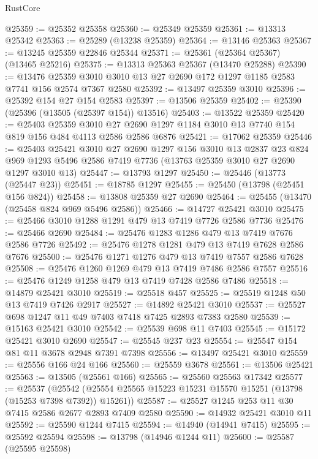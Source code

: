 \begin{lexlean}{RustCore}
\begin{coremodule}
@25359 := @25352 @25358
@25360 := @25349 @25359
@25361 := @13313 @25342
@25363 := @25289 (@13238 @25359)
@25364 := @13146 @25363
@25367 := @13245 @25359 @22846 @25344
@25371 := @25361 (@25364 @25367) (@13465 @25216)
@25375 := @13313 @25363 @25367 (@13470 @25288)
@25390 := @13476
    @25359
    @3010
    @3010
    @13
    @27
    @2690
    @172
    @1297
    @1185
    @2583
    @7741
    @156
    @2574
    @7367
    @2580
@25392 := @13497 @25359 @3010
@25396 := @25392 @154 @27 @154 @2583
@25397 := @13506 @25359
@25402 := @25390 (@25396 (@13505 (@25397 @154)) @13516)
@25403 := @13522 @25359
@25420 := @25403
    @25359
    @3010
    @27
    @2690
    @1297
    @1184
    @3010
    @13
    @7740
    @154
    @819
    @156
    @484
    @4113
    @2586
    @2586
    @6876
@25421 := @17062 @25359
@25446 := @25403
    @25421
    @3010
    @27
    @2690
    @1297
    @156
    @3010
    @13
    @2837
    @23
    @824
    @969
    @1293
    @5496
    @2586
    @7419
    @7736
    (@13763 @25359 @3010 @27 @2690 @1297 @3010 @13)
@25447 := @13793 @1297
@25450 := @25446 (@13773 (@25447 @23))
@25451 := @18785 @1297
@25455 := @25450 (@13798 (@25451 @156 @824))
@25458 := @13808 @25359 @27 @2690
@25464 := @25455 (@13470 (@25458 @824 @969 @5496 @2586))
@25466 := @14727 @25421 @3010
@25475 := @25466 @3010 @1288 @1291 @479 @13 @7419 @7726 @2586 @7736
@25476 := @25466 @2690
@25484 := @25476 @1283 @1286 @479 @13 @7419 @7676 @2586 @7726
@25492 := @25476 @1278 @1281 @479 @13 @7419 @7628 @2586 @7676
@25500 := @25476 @1271 @1276 @479 @13 @7419 @7557 @2586 @7628
@25508 := @25476 @1260 @1269 @479 @13 @7419 @7486 @2586 @7557
@25516 := @25476 @1249 @1258 @479 @13 @7419 @7428 @2586 @7486
@25518 := @14879 @25421 @3010
@25519 := @25518 @457
@25525 := @25519 @1248 @50 @13 @7419 @7426 @2917
@25527 := @14892 @25421 @3010
@25537 := @25527 @698 @1247 @11 @49 @7403 @7418 @7425 @2893 @7383 @2580
@25539 := @15163 @25421 @3010
@25542 := @25539 @698 @11 @7403
@25545 := @15172 @25421 @3010 @2690
@25547 := @25545 @237 @23
@25554 := @25547 @154 @81 @11 @3678 @2948 @7391 @7398
@25556 := @13497 @25421 @3010
@25559 := @25556 @166 @24 @166
@25560 := @25559 @3678
@25561 := @13506 @25421
@25563 := @13505 (@25561 @166)
@25565 := @25560 @25563 @17342
@25577 := @25537
    (@25542 (@25554 @25565 @15223 @15231 @15570 @15251 (@13798 (@15253 @7398 @7392)) @15261))
@25587 := @25527 @1245 @253 @11 @30 @7415 @2586 @2677 @2893 @7409 @2580
@25590 := @14932 @25421 @3010 @11
@25592 := @25590 @1244 @7415
@25594 := @14940 (@14941 @7415)
@25595 := @25592 @25594
@25598 := @13798 (@14946 @1244 @11)
@25600 := @25587 (@25595 @25598)

\end{coremodule}
\end{lexlean}
